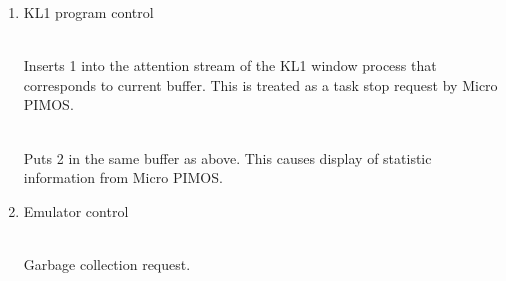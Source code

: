 \begin{enumerate}
\begin{enumerate}
\begin{itemize}
\\
Displays a candidate string, beginning with \verb|?- | and matches the previous
string which has been entered.
This is used to repeat the last interpreted command.

\\
Redisplays previous input.

\\
Deletes all text in the buffer.

\\
Deletes all text in all PDSS-mode buffers.

\\
Displays buffer menu of PDSS-mode buffer.

\\
Looks for the pattern module-name:predicate-name from the beginning of current
line, and start insert at its current position. This is convenient to set
variable name when setting variable monitor in the tracer.

\\
Displays built-in predicate manual.

\\
Displays command manual for command interpreter.

\\
Kills buffer, but gives a warning if PDSS is running.

\end{itemize}
\item KL1 program control
\begin{itemize}

\\
Inserts 1 into the attention stream of the KL1 window process that corresponds
to current buffer. This is treated as a task stop request by Micro PIMOS.

\\
Puts 2 in the same buffer as above. This causes display of
statistic information from Micro PIMOS.

\end{itemize}
\item Emulator control
\begin{itemize}

\\
Garbage collection request.


\end{itemize}
\end{enumerate}
\end{enumerate}
